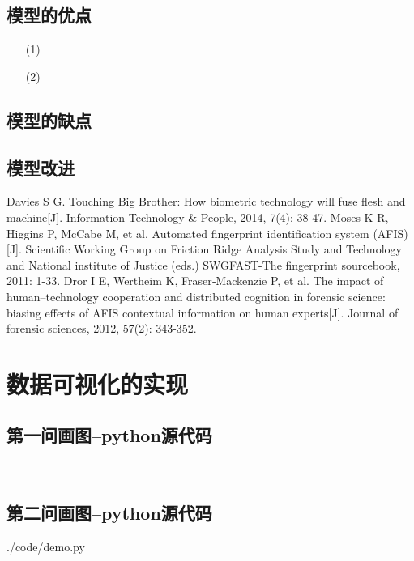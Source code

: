 \documentclass{whutmod}
\begin{document}
		\subsection{模型的优点}
			\begin{itemize}                                             
			\item [(1)]
			\item [(2)] 	
			\end{itemize}
		\subsection{模型的缺点}

  		\subsection{模型改进}

  
  
 
	\newpage	%
	\nocite{*}		%
	\begin{thebibliography}{9}%
		Davies S G. Touching Big Brother: How biometric technology will fuse flesh and machine[J]. Information Technology \& People, 2014, 7(4): 38-47.
	Moses K R, Higgins P, McCabe M, et al. Automated fingerprint identification system (AFIS)[J]. Scientific Working Group on Friction Ridge Analysis Study and Technology and National institute of Justice (eds.) SWGFAST-The fingerprint sourcebook, 2011: 1-33.
	Dror I E, Wertheim K, Fraser‐Mackenzie P, et al. The impact of human–technology cooperation and distributed cognition in forensic science: biasing effects of AFIS contextual information on human experts[J]. Journal of forensic sciences, 2012, 57(2): 343-352.
	\end{thebibliography}

	\newpage
	\appendix %
	\section{数据可视化的实现}
		\subsection*{第一问画图--python源代码}
			\begin{lstlisting}[language=python]
			
			\end{lstlisting}
			
		\subsection*{第二问画图--python源代码}
			 {./code/demo.py}
\end{document}
